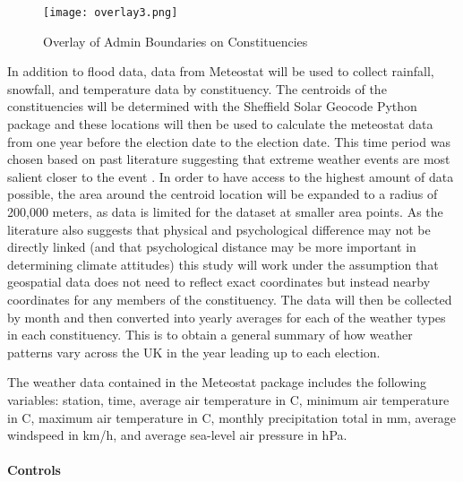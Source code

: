 \documentclass[12pt,letterpaper]{article}
\begin{document}
\begin{wrapfigure}[27]{l}{0.5\textwidth}
	\centering
	\texttt{[image: overlay3.png]}
	\caption{Overlay of Admin Boundaries on Constituencies}
	\label{fig:flood_overlay}
\end{wrapfigure}


In addition to flood data, data from Meteostat \autocite{MeteostatPyPI} will be used to collect rainfall, snowfall, and temperature data by constituency. The centroids of the constituencies will be determined with the Sheffield Solar Geocode Python package \autocite{GitHubSheffieldSolarGeocode} and these locations will then be used to calculate the meteostat data from one year before the election date to the election date. This time period was chosen based on past literature suggesting that extreme weather events are most salient closer to the event \autocite{viscontiEffectDifferentExtreme2024}. In order to have access to the highest amount of data possible, the area around the centroid location will be expanded to a radius of 200,000 meters, as data is limited for the dataset at smaller area points. As the literature also suggests that physical and psychological difference may not be directly linked (and that psychological distance may be more important in determining climate attitudes) \autocite{maiellaPsychologicalDistanceClimate2020} this study will work under the assumption that geospatial data does not need to reflect exact coordinates but instead nearby coordinates for any members of the constituency. The data will then be collected by month and then converted into yearly averages for each of the weather types in each constituency. This is to obtain a general summary of how weather patterns vary across the UK in the year leading up to each election.

The weather data contained in the Meteostat package includes the following variables: station, time, average air temperature in C, minimum air temperature in C, maximum air temperature in C, monthly precipitation total in mm, average windspeed in km/h, and average sea-level air pressure in hPa.

\paragraph{Controls}
\end{document}
